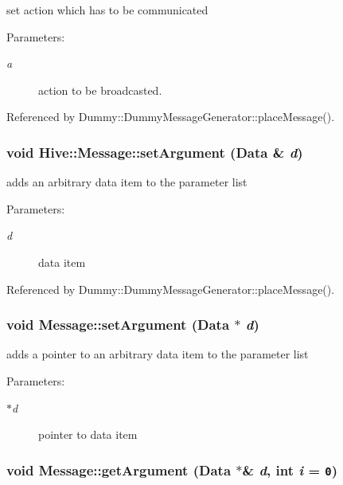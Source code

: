 set action which has to be communicated \begin{Desc}
\item[Parameters:]
\begin{description}
\item[{\em a}]action to be broadcasted. \end{description}
\end{Desc}


Referenced by Dummy::DummyMessageGenerator::placeMessage().
\subsubsection[setArgument]{\setlength{\rightskip}{0pt plus 5cm}void Hive::Message::setArgument ({\bf Data} \& {\em d})}\label{classHive_1_1Message_cc22028635f3bffdb5b5187e3cd3b052}


adds an arbitrary data item to the parameter list \begin{Desc}
\item[Parameters:]
\begin{description}
\item[{\em d}]data item \end{description}
\end{Desc}


Referenced by Dummy::DummyMessageGenerator::placeMessage().
\subsubsection[setArgument]{\setlength{\rightskip}{0pt plus 5cm}void Message::setArgument ({\bf Data} $\ast$ {\em d})}\label{classHive_1_1Message_975ed4851d03e7ab133845f3853eb16a}


adds a pointer to an arbitrary data item to the parameter list \begin{Desc}
\item[Parameters:]
\begin{description}
\item[{\em $\ast$d}]pointer to data item \end{description}
\end{Desc}
\subsubsection[getArgument]{\setlength{\rightskip}{0pt plus 5cm}void Message::getArgument ({\bf Data} $\ast$\& {\em d}, \/  int {\em i} = {\tt 0})}\label{classHive_1_1Message_29285c0e99174654d44ca2b7388ad9f5}


